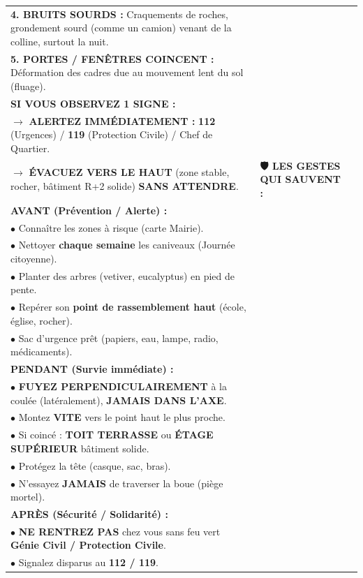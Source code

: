 \documentclass[11pt]{article}
\begin{document}
\begin{exoresolu}
\begin{center}
\begin{tabularx}{\linewidth}{|X|X|X|}
\textbf{4. BRUITS SOURDS :} Craquements de roches, grondement sourd (comme un camion) venant de la colline, surtout la nuit. \\
\textbf{5. PORTES / FENÊTRES COINCENT :} Déformation des cadres due au mouvement lent du sol (fluage). \\
\vspace{0.2cm}
\textbf{SI VOUS OBSERVEZ 1 SIGNE :} \\
$\rightarrow$ \textbf{ALERTEZ IMMÉDIATEMENT :} \textbf{112} (Urgences) / \textbf{119} (Protection Civile) / Chef de Quartier. \\
$\rightarrow$ \textbf{ÉVACUEZ VERS LE HAUT} (zone stable, rocher, bâtiment R+2 solide) \textbf{SANS ATTENDRE}. &
\vspace{0.2cm}
\textbf{🛡 LES GESTES QUI SAUVENT :} \\
\vspace{0.1cm}
\textbf{AVANT (Prévention / Alerte) :} \\
$\bullet$ Connaître les zones à risque (carte Mairie). \\
$\bullet$ Nettoyer \textbf{chaque semaine} les caniveaux (Journée citoyenne). \\
$\bullet$ Planter des arbres (vetiver, eucalyptus) en pied de pente. \\
$\bullet$ Repérer son \textbf{point de rassemblement haut} (école, église, rocher). \\
$\bullet$ Sac d'urgence prêt (papiers, eau, lampe, radio, médicaments). \\
\vspace{0.2cm}
\textbf{PENDANT (Survie immédiate) :} \\
$\bullet$ \textbf{FUYEZ PERPENDICULAIREMENT} à la coulée (latéralement), \textbf{JAMAIS DANS L'AXE}. \\
$\bullet$ Montez \textbf{VITE} vers le point haut le plus proche. \\
$\bullet$ Si coincé : \textbf{TOIT TERRASSE} ou \textbf{ÉTAGE SUPÉRIEUR} bâtiment solide. \\
$\bullet$ Protégez la tête (casque, sac, bras). \\
$\bullet$ N'essayez \textbf{JAMAIS} de traverser la boue (piège mortel). \\
\vspace{0.2cm}
\textbf{APRÈS (Sécurité / Solidarité) :} \\
$\bullet$ \textbf{NE RENTREZ PAS} chez vous sans feu vert \textbf{Génie Civil / Protection Civile}. \\
$\bullet$ Signalez disparus au \textbf{112 / 119}. \\

\end{tabularx}
\end{center}
\end{exoresolu}
\end{document}

